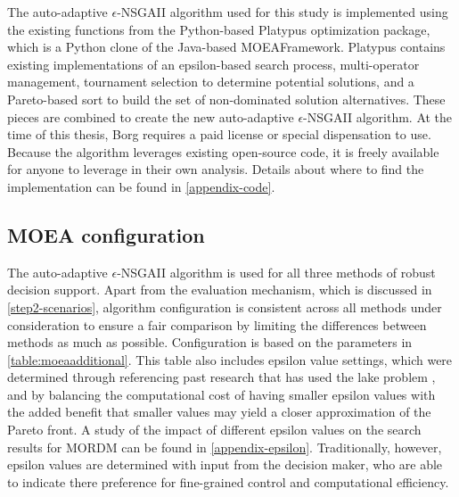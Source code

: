    The auto-adaptive $\epsilon$-NSGAII algorithm used for this study is implemented using the existing functions from the Python-based Platypus optimization package, which is a Python clone of the Java-based MOEAFramework. Platypus contains existing implementations of an epsilon-based search process, multi-operator management, tournament selection to determine potential solutions, and a Pareto-based sort to build the set of non-dominated solution alternatives. These pieces are combined to create the new auto-adaptive $\epsilon$-NSGAII algorithm. At the time of this thesis, Borg requires a paid license or special dispensation to use. Because the algorithm leverages existing open-source code, it is freely available for anyone to leverage in their own analysis. Details about where to find the implementation can be found in \cref{appendix-code}.

    \subsection{MOEA configuration}
    The auto-adaptive $\epsilon$-NSGAII algorithm is used for all three methods of robust decision support. Apart from the evaluation mechanism, which is discussed in \cref{step2-scenarios}, algorithm configuration is consistent across all methods under consideration to ensure a fair comparison by limiting the differences between methods as much as possible. Configuration is based on the parameters in \cref{table:moeaadditional}. This table also includes epsilon value settings, which were determined through referencing past research that has used the lake problem \citep{Quinn2017,Ward2015}, and by balancing the computational cost of having smaller epsilon values with the added benefit that smaller values may yield a closer approximation of the Pareto front. A study of the impact of different epsilon values on the search results for MORDM can be found in \cref{appendix-epsilon}. Traditionally, however, epsilon values are determined with input from the decision maker, who are able to indicate there preference for fine-grained control and computational efficiency. 

